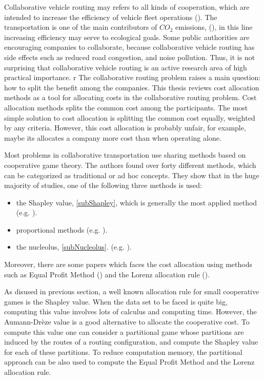 Collaborative vehicle routing may refers to all kinds of cooperation, which are intended to increase the efficiency of vehicle fleet operations (\cite{Gansterer}). The transportation is one of the main contributors of $CO_2$ emissions, (\cite{Ballot}), in this line increasing efficiency may serve to ecological goals. Some public authorities are encouraging companies to collaborate, because collaborative vehicle routing has side effects such as reduced road congestion, and noise pollution. Thus, it is not surprising that collaborative vehicle routing is an active research area of high practical importance.
r
The collaborative routing problem raises a main question: how to split the benefit among the companies. This thesis reviews cost allocation methods as a tool for allocating costs in the collaborative routing problem. Cost allocation methods splits the common cost among the participants. The most simple solution to cost allocation is splitting the common cost equally, weighted by any criteria. However, this cost allocation is probably unfair, for example, maybe its allocates a company more cost than when operating alone. 

Most problems in collaborative transportation use sharing methods based on cooperative game theory. The authors found over forty different methods, which can be categorized as traditional or ad hoc concepts. They show that in the huge majority of studies, one of the following three methods is used:
\begin{itemize}
	\item the Shapley value, \ref{subShapley}, which is generally the
	most applied method (e.g. \cite{Kimms}).
	\item proportional methods (e.g. \cite{Frisk}).
	\item the nucleolus, \ref{subNucleolus}. (e.g. \cite{Agarwal}).
\end{itemize}

Moreover, there are some papers which faces the cost allocation using methods such as Equal Profit Method (\cite{Frisk}) and the Lorenz allocation rule (\cite{Zon}).

As disused in previous section, a well known allocation rule for small cooperative games is the Shapley value. When the data set to be faced is quite big, computing this value involves lots of calculus and computing time. However, the Aumann-Dr\`eze value is a good alternative to allocate the cooperative cost. To compute this value one can consider a partitional game whose partitions are induced by the routes of a routing configuration, and compute the Shapley value for each of these partitions. To reduce computation memory, the partitional approach can be also used to compute the Equal Profit Method and the Lorenz allocation rule.

